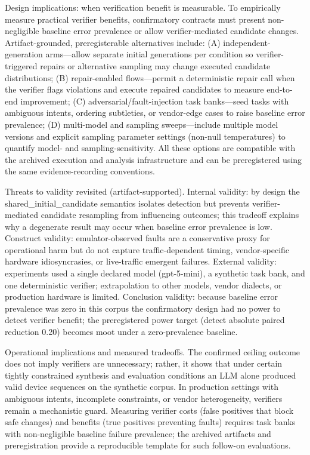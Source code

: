 \documentclass[conference]{IEEEtran}
\begin{document}
Design implications: when verification benefit is measurable. To empirically measure practical verifier benefits, confirmatory contracts must present non-negligible baseline error prevalence or allow verifier-mediated candidate changes. Artifact-grounded, preregisterable alternatives include: (A) independent-generation arms---allow separate initial generations per condition so verifier-triggered repairs or alternative sampling may change executed candidate distributions; (B) repair-enabled flows---permit a deterministic repair call when the verifier flags violations and execute repaired candidates to measure end-to-end improvement; (C) adversarial/fault-injection task banks---seed tasks with ambiguous intents, ordering subtleties, or vendor-edge cases to raise baseline error prevalence; (D) multi-model and sampling sweeps---include multiple model versions and explicit sampling parameter settings (non-null temperatures) to quantify model- and sampling-sensitivity. All these options are compatible with the archived execution and analysis infrastructure and can be preregistered using the same evidence-recording conventions.

Threats to validity revisited (artifact-supported). Internal validity: by design the shared\_initial\_candidate semantics isolates detection but prevents verifier-mediated candidate resampling from influencing outcomes; this tradeoff explains why a degenerate result may occur when baseline error prevalence is low. Construct validity: emulator-observed faults are a conservative proxy for operational harm but do not capture traffic-dependent timing, vendor-specific hardware idiosyncrasies, or live-traffic emergent failures. External validity: experiments used a single declared model (gpt-5-mini), a synthetic task bank, and one deterministic verifier; extrapolation to other models, vendor dialects, or production hardware is limited. Conclusion validity: because baseline error prevalence was zero in this corpus the confirmatory design had no power to detect verifier benefit; the preregistered power target (detect absolute paired reduction 0.20) becomes moot under a zero-prevalence baseline.

Operational implications and measured tradeoffs. The confirmed ceiling outcome does not imply verifiers are unnecessary; rather, it shows that under certain tightly constrained synthesis and evaluation conditions an LLM alone produced valid device sequences on the synthetic corpus. In production settings with ambiguous intents, incomplete constraints, or vendor heterogeneity, verifiers remain a mechanistic guard. Measuring verifier costs (false positives that block safe changes) and benefits (true positives preventing faults) requires task banks with non-negligible baseline failure prevalence; the archived artifacts and preregistration provide a reproducible template for such follow-on evaluations.
\end{document}
